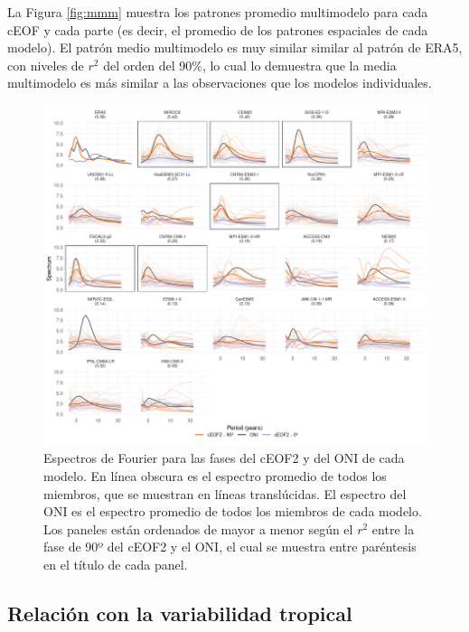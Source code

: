 \documentclass[12pt,oneside]{reedthesis}
\begin{document}
La Figura \ref{fig:mmm} muestra los patrones promedio multimodelo para cada cEOF y cada parte (es decir, el promedio de los patrones espaciales de cada modelo).
El patrón medio multimodelo es muy similar similar al patrón de ERA5, con niveles de \(r^2\) del orden del 90\%, lo cual lo demuestra que la media multimodelo es más similar a las observaciones que los modelos individuales.

\begin{figure}
\includegraphics{figures/50-cmip6/fft-ceof2-1} \caption{Espectros de Fourier para las fases del cEOF2 y del ONI de cada modelo. En línea obscura es el espectro promedio de todos los miembros, que se muestran en líneas translúcidas. El espectro del ONI es el espectro promedio de todos los miembros de cada modelo. Los paneles están ordenados de mayor a menor según el \(r^2\) entre la fase de 90º del cEOF2 y el ONI, el cual se muestra entre paréntesis en el título de cada panel.}\label{fig:fft-ceof2}
\end{figure}





\hypertarget{relaciuxf3n-con-la-variabilidad-tropical}{%
\subsection{Relación con la variabilidad tropical}\label{relaciuxf3n-con-la-variabilidad-tropical}}
\end{document}
